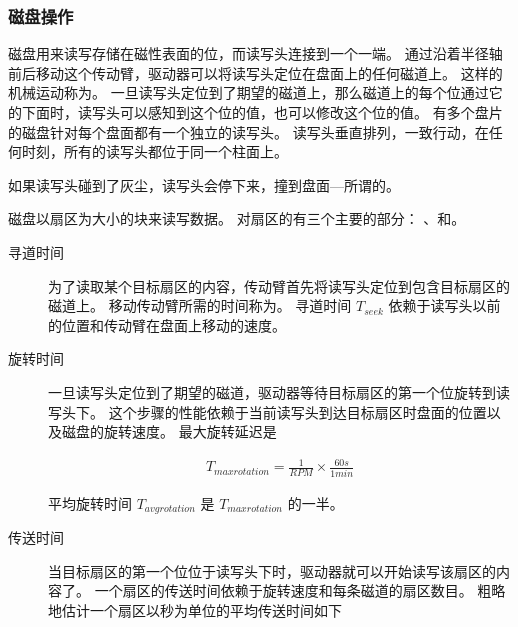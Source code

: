 {{        \subsubsection{磁盘操作}
        {
            磁盘用来读写存储在磁性表面的位，而读写头连接到一个一端。
            通过沿着半径轴前后移动这个传动臂，驱动器可以将读写头定位在盘面上的任何磁道上。
            这样的机械运动称为。
            一旦读写头定位到了期望的磁道上，那么磁道上的每个位通过它的下面时，读写头可以感知到这个位的值，也可以修改这个位的值。
            有多个盘片的磁盘针对每个盘面都有一个独立的读写头。
            读写头垂直排列，一致行动，在任何时刻，所有的读写头都位于同一个柱面上。

            如果读写头碰到了灰尘，读写头会停下来，撞到盘面---所谓的。

            磁盘以扇区为大小的块来读写数据。
            对扇区的有三个主要的部分：
            、和。

            \begin{description}
                \item[寻道时间]
                {
                    为了读取某个目标扇区的内容，传动臂首先将读写头定位到包含目标扇区的磁道上。
                    移动传动臂所需的时间称为。
                    寻道时间 $T_{seek}$ 依赖于读写头以前的位置和传动臂在盘面上移动的速度。
                }
                \item[旋转时间]
                {
                    一旦读写头定位到了期望的磁道，驱动器等待目标扇区的第一个位旋转到读写头下。
                    这个步骤的性能依赖于当前读写头到达目标扇区时盘面的位置以及磁盘的旋转速度。
                    最大旋转延迟是

                    \begin{align*}
                        T_{max rotation} = \frac{1}{RPM} \times \frac{60s}{1min}
                    \end{align*}

                    平均旋转时间 $T_{avg rotation}$ 是 $T_{max rotation}$ 的一半。
                }
                \item[传送时间]
                {
                    当目标扇区的第一个位位于读写头下时，驱动器就可以开始读写该扇区的内容了。
                    一个扇区的传送时间依赖于旋转速度和每条磁道的扇区数目。
                    粗略地估计一个扇区以秒为单位的平均传送时间如下

}
\end{description}}}}

